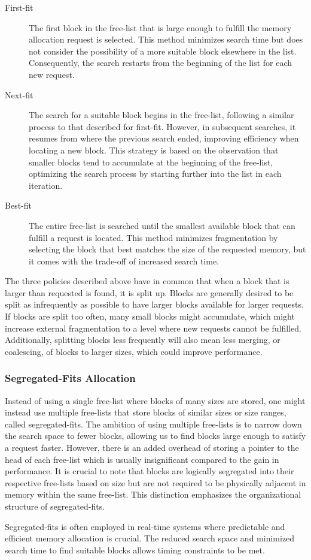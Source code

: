 \begin{description}
    \item[First-fit]
        The first block in the free-list that is large enough to fulfill the memory allocation request is selected. This method minimizes search time but does not consider the possibility of a more suitable block elsewhere in the list. Consequently, the search restarts from the beginning of the list for each new request.
    \item[Next-fit]
        The search for a suitable block begins in the free-list, following a similar process to that described for first-fit. However, in subsequent searches, it resumes from where the previous search ended, improving efficiency when locating a new block. This strategy is based on the observation that smaller blocks tend to accumulate at the beginning of the free-list, optimizing the search process by starting further into the list in each iteration.
    \item[Best-fit]
        The entire free-list is searched until the smallest available block that can fulfill a request is located. This method minimizes fragmentation by selecting the block that best matches the size of the requested memory, but it comes with the trade-off of increased search time.
\end{description}

The three policies described above have in common that when a block that is larger than requested is found, it is split up. Blocks are generally desired to be split as infrequently as possible to have larger blocks available for larger requests. If blocks are split too often, many small blocks might accumulate, which might increase external fragmentation to a level where new requests cannot be fulfilled. Additionally, splitting blocks less frequently will also mean less merging, or coalescing, of blocks to larger sizes, which could improve performance.

\subsubsection{Segregated-Fits Allocation}
Instead of using a single free-list where blocks of many sizes are stored, one might instead use multiple free-lists that store blocks of similar sizes or size ranges, called segregated-fits. The ambition of using multiple free-lists is to narrow down the search space to fewer blocks, allowing us to find blocks large enough to satisfy a request faster. However, there is an added overhead of storing a pointer to the head of each free-list which is usually insignificant compared to the gain in performance. It is crucial to note that blocks are logically segregated into their respective free-lists based on size but are not required to be physically adjacent in memory within the same free-list. This distinction emphasizes the organizational structure of segregated-fits.

Segregated-fits is often employed in real-time systems where predictable and efficient memory allocation is crucial. The reduced search space and minimized search time to find suitable blocks allows timing constraints to be met.

